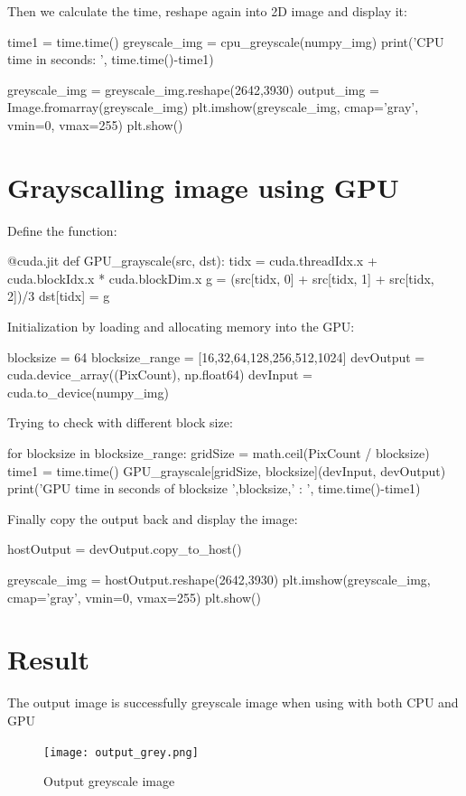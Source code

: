 \documentclass{article}
\begin{document}
Then we calculate the time, reshape again into 2D image and display it:
\begin{python}
time1 = time.time()
greyscale_img = cpu_greyscale(numpy_img)
print('CPU time in seconds: ', time.time()-time1)


greyscale_img = greyscale_img.reshape(2642,3930)
output_img = Image.fromarray(greyscale_img)
plt.imshow(greyscale_img, cmap='gray', vmin=0, vmax=255)
plt.show()
\end{python}

\section{Grayscalling image using GPU}
Define the function:
\begin{python}
@cuda.jit
def GPU_grayscale(src, dst):
    tidx = cuda.threadIdx.x + cuda.blockIdx.x * cuda.blockDim.x
    g = (src[tidx, 0] + src[tidx, 1] + src[tidx, 2])/3
    dst[tidx] = g
\end{python}

Initialization by loading and allocating memory into the GPU:
\begin{python}
blocksize = 64
blocksize_range = [16,32,64,128,256,512,1024]
devOutput = cuda.device_array((PixCount), np.float64)
devInput = cuda.to_device(numpy_img)
\end{python}

Trying to check with different block size:

\begin{python}
for blocksize in blocksize_range:
  gridSize = math.ceil(PixCount / blocksize)
  time1 = time.time()
  GPU_grayscale[gridSize, blocksize](devInput, devOutput)
  print('GPU time in seconds of blocksize ',blocksize,' : ', time.time()-time1)
\end{python}

Finally copy the output back and display the image:
\begin{python}
hostOutput = devOutput.copy_to_host()

greyscale_img = hostOutput.reshape(2642,3930)
plt.imshow(greyscale_img, cmap='gray', vmin=0, vmax=255)
plt.show()
\end{python}

\section{Result}
The output image is successfully greyscale image when using with both CPU and GPU
\begin{figure}
    \begin{center}
        \texttt{[image: output\_grey.png]}
        \caption{Output greyscale image}
    \end{center}
\end{figure}
\end{document}

